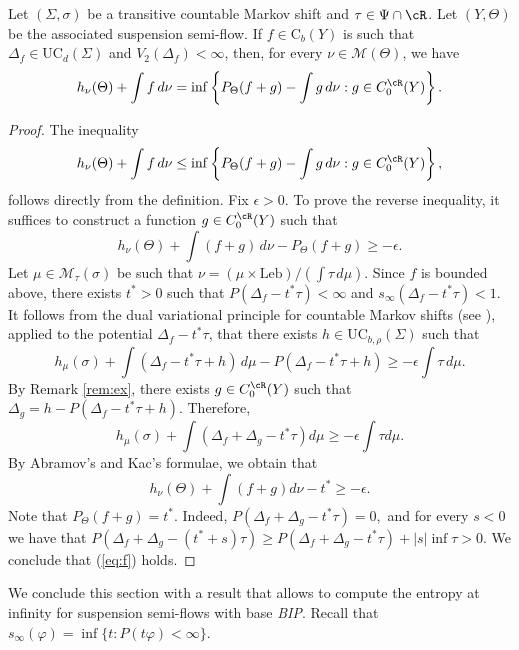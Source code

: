 \documentclass[letterpaper,11pt]{amsart}
\numberwithin{equation}{section}     %
\newcommand{\M}{\mathcal{M}}
\def\L{{\text{Leb}}}
\def\phi{\varphi}
\def\M{{\mathcal M}}
\def\ge{\geqslant}
\def\M{\mathcal{M}}
\begin{document}
\begin{theorem} \label{thm:dual}
Let $(\Sigma, \sigma)$ be a transitive countable Markov shift  and  $\tau\in\Psi\cap \cR$. Let $(Y,\Theta)$ be the associated suspension semi-flow. If $f\in \mathrm{C}_b(Y)$ is such that $\Delta_f\in \mathrm{UC}_d(\Sigma)$ and $V_2(\Delta_f)<\infty$, then, for every $\nu \in \M(\Theta)$, we have
\begin{equation*}
h_\nu(\Theta)+\int f \, d\nu= \inf \left\{P_{\Theta}(f+g) - \int g \, d \nu :g\in C^\cR_0(Y)		\right\}.
\end{equation*}
\end{theorem}

\begin{proof}The inequality 
$$h_\nu(\Theta)+\int f \, d\nu \leq \inf \left\{P_{\Theta}(f+g) - \int g \, d \nu : g \in C^\cR_0(Y)			\right\},$$
follows directly from the definition. Fix $\epsilon>0$. To prove the reverse inequality, it suffices to construct a function $g \in C^\cR_0(Y)$ such that
\begin{equation} \label{eq:f}
h_\nu(\Theta) + \int (f+g) \, d \nu -  P_{\Theta}(f+g)\ge - \epsilon.
\end{equation}
Let  $\mu \in \M_\tau(\sigma)$ be such that $\nu=(\mu \times \L)/(\int \tau \, d \mu)$. Since $f$ is bounded above, there exists $t^*>0$ such that $P(\Delta_f-t^*\tau) <\infty$ and $s_\infty(\Delta_f-t^*\tau)<1$. It follows from the dual variational principle for countable Markov shifts (see  \cite[Theorem 1.4]{iv2}), applied to the potential $\Delta_f-t^*\tau$, that there exists $h \in \text{UC}_{b,\rho}(\Sigma)$ such that 
\begin{equation*} \label{eq:estrella} 
h_\mu(\sigma) + \int \left(\Delta_f-t^* \tau + h \right) \, d\mu  -P(\Delta_f-t^* \tau + h) \ge  - \epsilon \int \tau \, d\mu.
\end{equation*}
By Remark \ref{rem:ex}, there exists $g \in C^\cR_0(Y)$ such that $\Delta_{g}=  h - P(\Delta_f-t^* \tau + h)$.  Therefore,
$$h_\mu(\sigma) +\int(\Delta_f+\Delta_g-t^*\tau) d\mu \ge  -\epsilon \int \tau d\mu.$$
By Abramov's and Kac's formulae, we obtain that
$$h_\nu(\Theta) +\int (f+g) d\nu -t^* \ge  -\epsilon.$$
Note that $P_{\Theta}(f+g)=t^*$. Indeed, $P(\Delta_f+\Delta_{g}-t^*\tau)=0,$ and for every $s <0$ we have that
$P(\Delta_f+\Delta_{g} -(t^*+s) \tau) \geq  P(\Delta_f+\Delta_{g}-t^*\tau) + |s| \inf \tau >0$. We conclude that (\ref{eq:f}) holds.
\end{proof}

We conclude this section with a result that allows to compute the entropy at infinity for suspension semi-flows with base \emph{BIP}. Recall that $s_\infty(\phi)=\inf\{t:P(t\phi)<\infty\}$.
\end{document}
